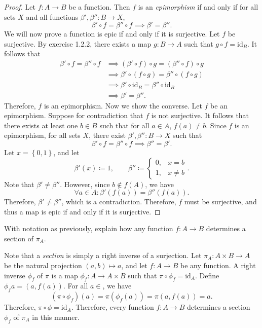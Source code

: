 \documentclass[11pt]{report}
\begin{document}
\begin{proof}
	Let $f : A \to B$ be a function. Then $f$ is an \emph{epimorphism} if and only if for all sets $X$ and all functions $\beta',\beta '': B \to X$,
	\[
		\beta '\circ f=\beta ''\circ f\implies \beta '=\beta ''
	.\]
	We will now prove a function is epic if and only if it is surjective. Let $f$ be surjective. By exercise 1.2.2, there exists a map $g : B \to A$ such that $g\circ f=\mathrm{id}_B$. It follows that
	\begin{align*}
		\beta '\circ f=\beta ''\circ f &\implies \left( \beta '\circ f \right) \circ g=\left( \beta ''\circ f \right) \circ g\\
					       &\implies \beta '\circ \left( f\circ g \right) =\beta ''\circ (f\circ g)\\
					       &\implies \beta '\circ \mathrm{id}_B =\beta ''\circ \mathrm{id}_B\\
					       &\implies \beta '=\beta ''
	.\end{align*}
	Therefore, $f$ is an epimorphism. Now we show the converse. Let $f$ be an epimorphism. Suppose for contradiction that $f$ is not surjective. It follows that there exists at least one $b\in B$ such that for all $a\in A$, $f(a)\neq b$. Since $f$ is an epimorphism, for all sets $X$, there exist $\beta ',\beta '': B \to X $ such that
	\[
		\beta '\circ f=\beta ''\circ f \implies \beta ''=\beta '
	.\]
	Let $x=\left\{ 0,1 \right\} $, and let
	\[
		\beta '(x)\coloneqq 1,\qquad \beta ''\coloneqq 
		\begin{cases}
			0,&x=b\\
			1,&x\neq b
		\end{cases}
	.\]
	Note that $\beta '\neq \beta ''$. However, since $b\notin f(A)$, we have
	\[
		\forall a\in A:\beta '(f(a))=\beta ''(f(a))
	.\]
	Therefore, $\beta '\neq \beta ''$, which is a contradiction. Therefore, $f$ must be surjective, and thus a map is epic if and only if it is surjective.
\end{proof}
\begin{exercise}
	With notation as previously, explain how any function $f : A \to B$ determines a section of $\pi _A$.
\end{exercise}
\begin{solution}
	Note that a \emph{section} is simply a right inverse of a surjection. Let $\pi_A : A\times B \to A$ be the natural projection $(a,b)\mapsto a$, and let $f : A \to B$ be any function. A right inverse $\phi_f $ of $\pi $ is a map $\phi_f : A \to A\times B$ such that $\pi \circ \phi_f =\mathrm{id}_A$. Define $\phi_f a=(a,f(a))$. For all $a\in $, we have
	\[
		(\pi \circ \phi_f )(a)=\pi (\phi_f (a))=\pi (a,f(a))=a
	.\]
	Therefore, $\pi \circ \phi =\mathrm{id}_A$. Therefore,  every function $f : A \to B$ determines a section $\phi_f$ of $\pi_A$ in this manner.
\end{solution}
\end{document}
